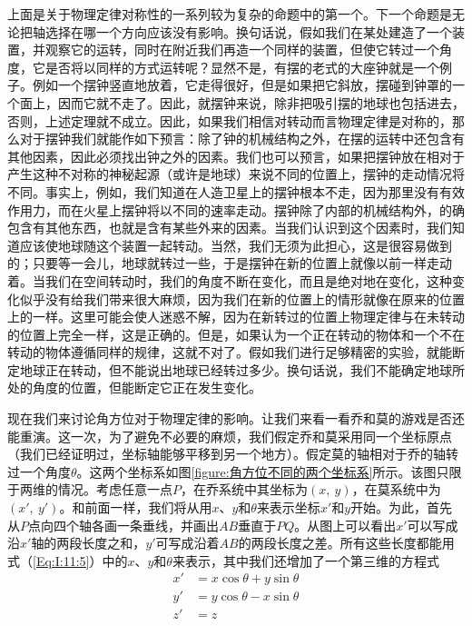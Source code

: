 上面是关于物理定律对称性的一系列较为复杂的命题中的第一个。下一个命题是无论把轴选择在哪一个方向应该没有影响。换句话说，假如我们在某处建造了一个装置，并观察它的运转，同时在附近我们再造一个同样的装置，但使它转过一个角度，它是否将以同样的方式运转呢？显然不是，有摆的老式的大座钟就是一个例子。例如一个摆钟竖直地放着，它走得很好，但是如果把它斜放，摆碰到钟罩的一个面上，因而它就不走了。因此，就摆钟来说，除非把吸引摆的地球也包括进去，否则，上述定理就不成立。因此，如果我们相信对转动而言物理定律是对称的，那么对于摆钟我们就能作如下预言：除了钟的机械结构之外，在摆的运转中还包含有其他因素，因此必须找出钟之外的因素。我们也可以预言，如果把摆钟放在相对于产生这种不对称的神秘起源（或许是地球）来说不同的位置上，摆钟的走动情况将不同。事实上，例如，我们知道在人造卫星上的摆钟根本不走，因为那里没有有效作用力，而在火星上摆钟将以不同的速率走动。摆钟除了内部的机械结构外，的确包含有其他东西，也就是含有某些外来的因素。当我们认识到这个因素时，我们知道应该使地球随这个装置一起转动。当然，我们无须为此担心，这是很容易做到的；只要等一会儿，地球就转过一些，于是摆钟在新的位置上就像以前一样走动着。当我们在空间转动时，我们的角度不断在变化，而且是绝对地在变化，这种变化似乎没有给我们带来很大麻烦，因为我们在新的位置上的情形就像在原来的位置上的一样。这里可能会使人迷惑不解，因为在新转过的位置上物理定律与在未转动的位置上完全一样，这是正确的。但是，如果认为一个正在转动的物体和一个不在转动的物体遵循同样的规律，这就不对了。假如我们进行足够精密的实验，就能断定地球正在转动，但不能说出地球已经转过多少。换句话说，我们不能确定地球所处的角度的位置，但能断定它正在发生变化。

现在我们来讨论角方位对于物理定律的影响。让我们来看一看乔和莫的游戏是否还能重演。这一次，为了避免不必要的麻烦，我们假定乔和莫采用同一个坐标原点（我们已经证明过，坐标轴能够平移到另一个地方）。假定莫的轴相对于乔的轴转过一个角度$\theta$。这两个坐标系如图\ref{figure:角方位不同的两个坐标系}所示。该图只限于两维的情况。考虑任意一点$P$，在乔系统中其坐标为$(x,~y)$，在莫系统中为	$(x',~y')$。和前面一样，我们将从用$x$、$y$和$\theta$来表示坐标$x'$和$y$开始。为此，首先从$P$点向四个轴各画一条垂线，并画出$AB$垂直于$PQ$。从图上可以看出$x'$可以写成沿$x'$轴的两段长度之和，$y'$可写成沿着$AB$的两段长度之差。所有这些长度都能用式（\ref{Eq:I:11:5}）中的$x$、$y$和$\theta$来表示，其中我们还增加了一个第三维的方程式
\begin{equation}
    \label{Eq:I:11:5}
    \begin{aligned}
        x'&=x \cos \theta + y \sin \theta \\
        y'&=y \cos \theta - x \sin \theta \\
        z'&=z
    \end{aligned}
\end{equation}

